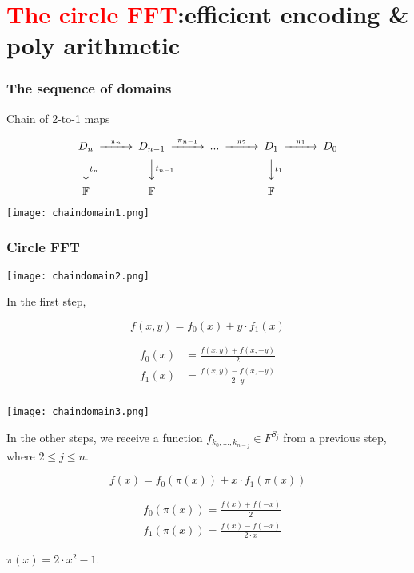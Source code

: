\documentclass{beamer}
\begin{document}
\section{\textcolor{red}{The circle FFT}:efficient encoding \& poly arithmetic}


\begin{frame}
\frametitle{The sequence of domains}
Chain of 2-to-1 maps


$$
\begin{CD}
D_n @>\pi_n>> D_{n-1} @>\pi_{n-1}>> ... @>\pi_2>> D_1 @>\pi_1>> D_0       \\
@VV{t_n}V     @VV{t_{n-1}}V         @.            @VV{t_1}V      \\
\mathbb{F}   @.        \mathbb{F}       @.                @.        \mathbb{F}   @. 
\end{CD}
$$

\texttt{[image: chaindomain1.png]}
\end{frame}



\begin{frame}
	\frametitle{Circle FFT}
	
\texttt{[image: chaindomain2.png]}	
	
In the first step,
	
$$
f(x, y)=f_0(x)+y \cdot f_1(x)
$$

$$
\begin{aligned}
f_0(x) & =\frac{f(x, y)+f(x,-y)}{2} \\
f_1(x) & =\frac{f(x, y)-f(x,-y)}{2 \cdot y}
\end{aligned}
$$
	
	
\end{frame}

\begin{frame}
	\frametitle{}
	\texttt{[image: chaindomain3.png]}	

	In the other steps, we receive a function $f_{k_0, \ldots, k_{n-j}} \in F^{S_j}$ from a previous step, where $2 \leq j \leq n$. 
	
$$
f(x)=f_0(\pi(x))+x \cdot f_1(\pi(x))
$$

$$
\begin{aligned}
& f_0(\pi(x))=\frac{f(x)+f(-x)}{2} \\
& f_1(\pi(x))=\frac{f(x)-f(-x)}{2 \cdot x}
\end{aligned}
$$

$\pi(x)=2 \cdot x^2-1$. \end{frame}
\end{document}
